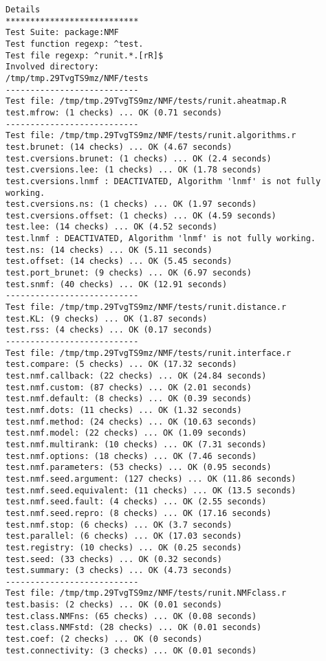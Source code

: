 \documentclass[10pt]{article}
\begin{document}
\begin{verbatim}
Details 
*************************** 
Test Suite: package:NMF 
Test function regexp: ^test. 
Test file regexp: ^runit.*.[rR]$ 
Involved directory: 
/tmp/tmp.29TvgTS9mz/NMF/tests 
--------------------------- 
Test file: /tmp/tmp.29TvgTS9mz/NMF/tests/runit.aheatmap.R 
test.mfrow: (1 checks) ... OK (0.71 seconds)
--------------------------- 
Test file: /tmp/tmp.29TvgTS9mz/NMF/tests/runit.algorithms.r 
test.brunet: (14 checks) ... OK (4.67 seconds)
test.cversions.brunet: (1 checks) ... OK (2.4 seconds)
test.cversions.lee: (1 checks) ... OK (1.78 seconds)
test.cversions.lnmf : DEACTIVATED, Algorithm 'lnmf' is not fully working.
test.cversions.ns: (1 checks) ... OK (1.97 seconds)
test.cversions.offset: (1 checks) ... OK (4.59 seconds)
test.lee: (14 checks) ... OK (4.52 seconds)
test.lnmf : DEACTIVATED, Algorithm 'lnmf' is not fully working.
test.ns: (14 checks) ... OK (5.11 seconds)
test.offset: (14 checks) ... OK (5.45 seconds)
test.port_brunet: (9 checks) ... OK (6.97 seconds)
test.snmf: (40 checks) ... OK (12.91 seconds)
--------------------------- 
Test file: /tmp/tmp.29TvgTS9mz/NMF/tests/runit.distance.r 
test.KL: (9 checks) ... OK (1.87 seconds)
test.rss: (4 checks) ... OK (0.17 seconds)
--------------------------- 
Test file: /tmp/tmp.29TvgTS9mz/NMF/tests/runit.interface.r 
test.compare: (5 checks) ... OK (17.32 seconds)
test.nmf.callback: (22 checks) ... OK (24.84 seconds)
test.nmf.custom: (87 checks) ... OK (2.01 seconds)
test.nmf.default: (8 checks) ... OK (0.39 seconds)
test.nmf.dots: (11 checks) ... OK (1.32 seconds)
test.nmf.method: (24 checks) ... OK (10.63 seconds)
test.nmf.model: (22 checks) ... OK (1.09 seconds)
test.nmf.multirank: (10 checks) ... OK (7.31 seconds)
test.nmf.options: (18 checks) ... OK (7.46 seconds)
test.nmf.parameters: (53 checks) ... OK (0.95 seconds)
test.nmf.seed.argument: (127 checks) ... OK (11.86 seconds)
test.nmf.seed.equivalent: (11 checks) ... OK (13.5 seconds)
test.nmf.seed.fault: (4 checks) ... OK (2.55 seconds)
test.nmf.seed.repro: (8 checks) ... OK (17.16 seconds)
test.nmf.stop: (6 checks) ... OK (3.7 seconds)
test.parallel: (6 checks) ... OK (17.03 seconds)
test.registry: (10 checks) ... OK (0.25 seconds)
test.seed: (33 checks) ... OK (0.32 seconds)
test.summary: (3 checks) ... OK (4.73 seconds)
--------------------------- 
Test file: /tmp/tmp.29TvgTS9mz/NMF/tests/runit.NMFclass.r 
test.basis: (2 checks) ... OK (0.01 seconds)
test.class.NMFns: (65 checks) ... OK (0.08 seconds)
test.class.NMFstd: (28 checks) ... OK (0.01 seconds)
test.coef: (2 checks) ... OK (0 seconds)
test.connectivity: (3 checks) ... OK (0.01 seconds)

\end{verbatim}
\end{document}
